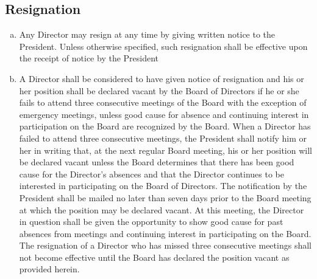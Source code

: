 \subsection{Resignation}
\begin{enumerate}[a.]
\item Any Director may resign at any time by giving written notice to
  the President. Unless otherwise specified, such resignation shall be
  effective upon the receipt of notice by the President
\item A Director shall be considered to have given notice of
  resignation and his or her position shall be declared vacant by the
  Board of Directors if he or she fails to attend three consecutive
  meetings of the Board with the exception of emergency meetings,
  unless good cause for absence and continuing interest in
  participation on the Board are recognized by the Board. When a
  Director has failed to attend three consecutive meetings, the
  President shall notify him or her in writing that, at the next
  regular Board meeting, his or her position will be declared vacant
  unless the Board determines that there has been good cause for the
  Director’s absences and that the Director continues to be interested
  in participating on the Board of Directors. The notification by the
  President shall be mailed no later than seven days prior to the
  Board meeting at which the position may be declared vacant. At this
  meeting, the Director in question shall be given the opportunity to
  show good cause for past absences from meetings and continuing
  interest in participating on the Board. The resignation of a
  Director who has missed three consecutive meetings shall not become
  effective until the Board has declared the position vacant as
  provided herein.
\end{enumerate}

